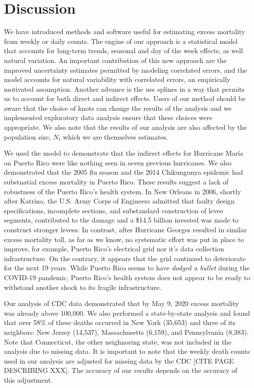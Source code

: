 \documentclass[11pt]{article}
\begin{document}
\section{Discussion}
We have introduced methods and software useful for estimating excess mortality from weekly or daily counts. The engine of our approach is a statistical model that accounts for long-term trends, seasonal and day of the week effects, as well natural variation. An important contribution of this new approach are the improved uncertainty estimates permitted by modeling correlated errors, and 
the model accounts for natural variability with correlated errors, an empirically motivated assumption. Another advance is the use splines in a way that permits us to account for both direct and indirect effects. Users of our method should be aware that the choice of knots can change the results of the analysis and we implemented exploratory data analysis ensure that these choices were appropriate. We also note that the results of our analysis are also affected by the population size, $N_t$ which we are themselves estimates. 

We used the model to demonstrate that the indirect effects for Hurricane María on Puerto Rico were like nothing seen in seven previous hurricanes. We also demonstrated that the 2005 flu season and the 2014 Chikungunya epidemic had substnatial excess mortality in Puerto Rico. These results suggest a lack of robustness of the Puerto Rico's health system. In New Orleans in 2006, shortly after Katrina,
the U.S. Army Corps of Engineers admitted that faulty design specifications, incomplete sections,
and substandard construction of levee segments, contributed to the damage and a \$14.5 billion invested was made to construct stronger levees. In contrast, after Hurricane Georges resulted in similar excess mortality toll, as far as we know, no systematic effort was put in place to improve, for example, Puerto Rico’s electrical grid nor it's data collection infrastructure. On the contrary, it appears that the grid continued to deteriorate for the next 19 years. While Puerto Rico seems to have \emph{dodged a bullet} during the COVID-19 pandemic, Puerto Rico’s health system does not appear to be ready to withstand another shock to its fragile infrastructure.

Our analysis of CDC data demonstrated that by May 9, 2020 excess mortality was already above 100,000. We also performed a state-by-state analysis and found that over 58\% of these deaths occurred in New York (35,653) and three of its neighbors: New Jersey (14,537), Massachusetts (6,159), and Pennsylvania (8,383). Note that Connecticut, the other neighnoring state, was not included in the analysis due to missing data. It is important to note that the weekly death counts used in our analysis are adjusted for missing data by the CDC [CITE PAGE DESCRIBING XXX]. The accuracy of our results depends on the accuracy of this adjustment. 
\end{document}
